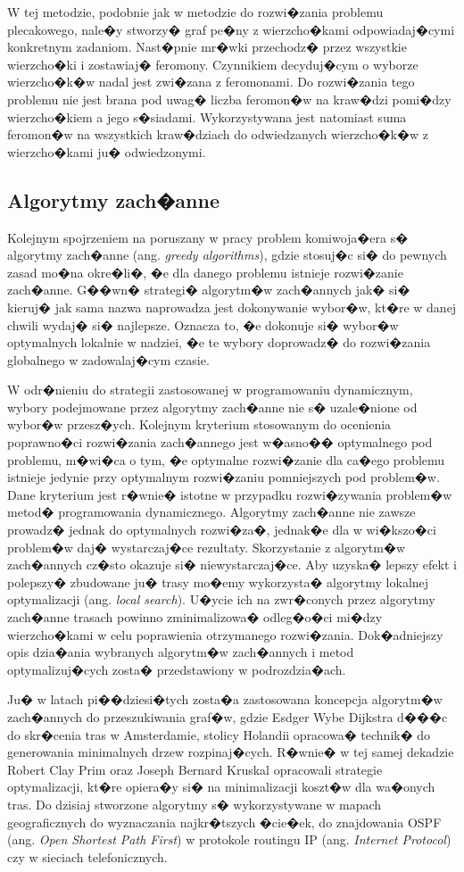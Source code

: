 W tej metodzie, podobnie jak w metodzie do rozwi�zania problemu plecakowego, nale�y stworzy� graf pe�ny z wierzcho�kami odpowiadaj�cymi konkretnym zadaniom. Nast�pnie mr�wki przechodz� przez wszystkie wierzcho�ki i zostawiaj� feromony. Czynnikiem decyduj�cym o wyborze wierzcho�k�w nadal jest zwi�zana z feromonami. Do rozwi�zania tego problemu nie jest brana pod uwag� liczba feromon�w na kraw�dzi pomi�dzy wierzcho�kiem a jego s�siadami. Wykorzystywana jest natomiast suma feromon�w na wszystkich kraw�dziach do odwiedzanych wierzcho�k�w z wierzcho�kami ju� odwiedzonymi.


\subsection{Algorytmy zach�anne}
	Kolejnym spojrzeniem na poruszany w pracy problem komiwoja�era s� algorytmy zach�anne (ang. \textit{greedy algorithms}), gdzie stosuj�c si� do pewnych zasad mo�na okre�li�, �e dla danego problemu istnieje rozwi�zanie zach�anne. G��wn� strategi� algorytm�w zach�annych jak� si� kieruj� jak sama nazwa naprowadza jest dokonywanie wybor�w, kt�re w danej chwili wydaj� si� najlepsze. Oznacza to, �e dokonuje si� wybor�w optymalnych lokalnie w nadziei, �e te wybory doprowadz� do rozwi�zania globalnego w zadowalaj�cym czasie. 
	
	
	W odr�nieniu do strategii zastosowanej w programowaniu dynamicznym, wybory podejmowane przez algorytmy zach�anne nie s� uzale�nione od wybor�w przesz�ych. Kolejnym kryterium stosowanym do ocenienia poprawno�ci rozwi�zania zach�annego jest w�asno�� optymalnego pod problemu, m�wi�ca o tym, �e optymalne rozwi�zanie dla ca�ego problemu istnieje jedynie przy optymalnym rozwi�zaniu pomniejszych pod problem�w. Dane kryterium jest r�wnie� istotne w przypadku rozwi�zywania problem�w metod� programowania dynamicznego. Algorytmy zach�anne nie zawsze prowadz� jednak do optymalnych rozwi�za�, jednak�e dla w wi�kszo�ci problem�w daj� wystarczaj�ce rezultaty.
	Skorzystanie z algorytm�w zach�annych cz�sto okazuje si� niewystarczaj�ce. Aby uzyska� lepszy efekt i polepszy� zbudowane ju� trasy mo�emy wykorzysta� algorytmy lokalnej optymalizacji (ang. \textit{local search}). U�ycie ich na zwr�conych przez algorytmy zach�anne trasach powinno zminimalizowa� odleg�o�ci mi�dzy wierzcho�kami w celu poprawienia otrzymanego rozwi�zania. Dok�adniejszy opis dzia�ania wybranych algorytm�w zach�annych i metod optymalizuj�cych zosta� przedstawiony w podrozdzia�ach.

	
	Ju� w latach pi��dziesi�tych zosta�a zastosowana koncepcja algorytm�w zach�annych do przeszukiwania graf�w, gdzie Esdger Wybe Dijkstra d���c do skr�cenia tras w Amsterdamie, stolicy Holandii opracowa� technik� do generowania minimalnych drzew rozpinaj�cych. R�wnie� w tej samej dekadzie Robert Clay Prim oraz Joseph Bernard Kruskal opracowali strategie optymalizacji, kt�re opiera�y si� na minimalizacji koszt�w dla wa�onych tras. Do dzisiaj stworzone algorytmy s� wykorzystywane w mapach geograficznych do wyznaczania najkr�tszych �cie�ek, do znajdowania OSPF (ang. \textit{Open Shortest Path First}) w protokole routingu IP (ang. \textit{Internet Protocol}) czy w sieciach telefonicznych.
	

